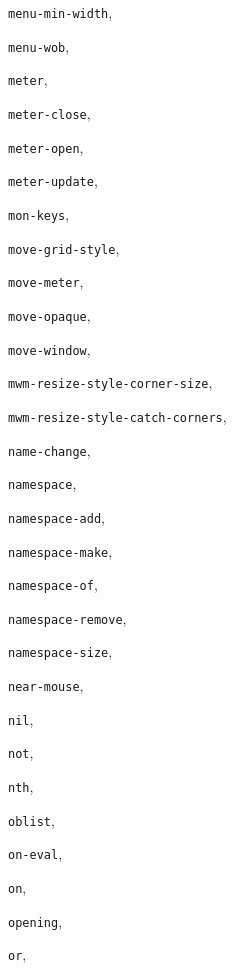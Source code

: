 \begin{theindex}
\item {\tt menu-min-width}, {\bf\pageref{menu-min-width}}
\item {\tt menu-wob}, {\bf\pageref{menu-wob}}
\item {\tt meter}, {\bf\pageref{meter}}
\item {\tt meter-close}, {\bf\pageref{meter-close}}
\item {\tt meter-open}, {\bf\pageref{meter-open}}
\item {\tt meter-update}, {\bf\pageref{meter-update}}
\item {\tt mon-keys}, {\bf\pageref{mon-keys}}
\item {\tt move-grid-style}, {\bf\pageref{move-grid-style}}
\item {\tt move-meter}, {\bf\pageref{move-meter}}
\item {\tt move-opaque}, {\bf\pageref{move-opaque}}
\item {\tt move-window}, {\bf\pageref{move-window}}
\item {\tt mwm-resize-style-corner-size}, {\bf\pageref{mwm-resize-style-corner-size}}
\item {\tt mwm-resize-style-catch-corners}, {\bf\pageref{mwm-resize-style-catch-corners}}
\item {\tt name-change}, {\bf\pageref{name-change}}
\item {\tt namespace}, {\bf\pageref{namespace}}
\item {\tt namespace-add}, {\bf\pageref{namespace-add}}
\item {\tt namespace-make}, {\bf\pageref{namespace-make}}
\item {\tt namespace-of}, {\bf\pageref{namespace-of}}
\item {\tt namespace-remove}, {\bf\pageref{namespace-remove}}
\item {\tt namespace-size}, {\bf\pageref{namespace-size}}
\item {\tt near-mouse}, {\bf\pageref{near-mouse}}
\item {\tt nil}, {\bf\pageref{nil}}
\item {\tt not}, {\bf\pageref{not}}
\item {\tt nth}, {\bf\pageref{nth}}
\item {\tt oblist}, {\bf\pageref{oblist}}
\item {\tt on-eval}, {\bf\pageref{on-eval}}
\item {\tt on}, {\bf\pageref{on}}
\item {\tt opening}, {\bf\pageref{opening}}
\item {\tt or}, {\bf\pageref{or}}

\end{theindex}
